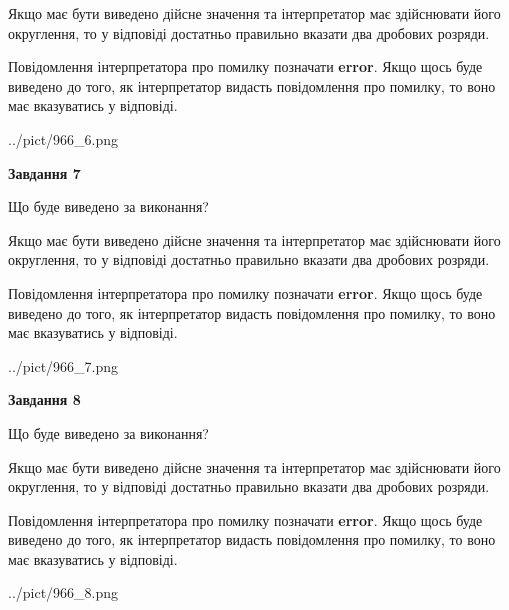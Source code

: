 \documentclass[12pt, ukrainian]{article}
\begin{document}
{\begin {Large}
Якщо має бути виведено дійсне значення та інтерпретатор має здійснювати його округлення, 
то у відповіді достатньо правильно вказати два дробових розряди.

Повідомлення інтерпретатора про помилку позначати \textbf{error}.
Якщо щось буде виведено до того, як інтерпретатор видасть повідомлення про помилку, 
то воно має вказуватись у відповіді. \par

\begin{center}
	{../pict/966_6.png}
\end{center}
\newpage

{\begin {center}\textbf{Завдання 7}\end {center}}\par
Що буде виведено за виконання? \par

Якщо має бути виведено дійсне значення та інтерпретатор має здійснювати його округлення, 
то у відповіді достатньо правильно вказати два дробових розряди.

Повідомлення інтерпретатора про помилку позначати \textbf{error}.
Якщо щось буде виведено до того, як інтерпретатор видасть повідомлення про помилку, 
то воно має вказуватись у відповіді. \par

\begin{center}
	{../pict/966_7.png}
\end{center}
\newpage

{\begin {center}\textbf{Завдання 8}\end {center}}\par
Що буде виведено за виконання? \par

Якщо має бути виведено дійсне значення та інтерпретатор має здійснювати його округлення, 
то у відповіді достатньо правильно вказати два дробових розряди.

Повідомлення інтерпретатора про помилку позначати \textbf{error}.
Якщо щось буде виведено до того, як інтерпретатор видасть повідомлення про помилку, 
то воно має вказуватись у відповіді. \par

\begin{center}
	{../pict/966_8.png}
\end{center}
\newpage


\end{Large}}
\end{document}
